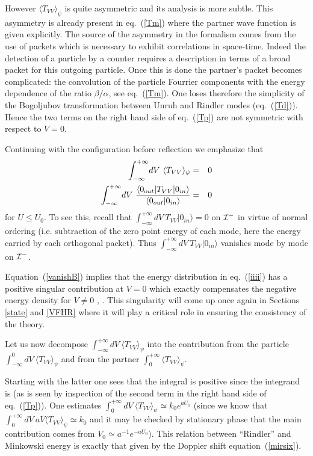 \documentclass[12pt,oneside]{report}
\def\ket#1{|#1\rangle}
\def\bra#1{\langle #1|}
\begin{document}
However $\langle T_{VV}\rangle_\psi$ is quite asymmetric and its
analysis is more subtle. This asymmetry is already present in 
eq.~(\ref{Tm}) where the partner wave function is given explicitly.
 The source of
the asymmetry in the formalism comes from the use of packets
which is necessary to exhibit correlations in space-time. Indeed the
detection of a particle by a counter requires a description in terms of
a broad packet for this outgoing particle. Once this is done the
partner's packet becomes complicated: the convolution of the particle
Fourrier components with the energy dependence of the ratio
$\beta / \alpha$, see eq.~(\ref{Tm}). One loses therefore the
simplicity of the Bogoljubov transformation between Unruh and
Rindler modes (eq.~(\ref{Td})). Hence  the  two terms on the right hand
side of eq.~(\ref{Tp}) are not symmetric with respect to $V=0$.

Continuing with the configuration before reflection
we emphasize that 
\begin{eqnarray}
\int_{-\infty}^{+\infty}
\!dV\ \langle T_{VV} \rangle_{\psi} &=&0\label{vanish}\\
\int_{-\infty}^{+\infty} \!dV\ { \bra{0_{out}} T_{VV}\ket{0_{in}}
\over
\bra{0_{out}} 0_{in}\rangle } &=& 0 \label{vanishB}
\end{eqnarray}
  for $U\leq U_0$. To see this, recall that 
$\int_{-\infty}^{+\infty}
\!dV\  T_{VV} \ket{0_{in}}=0$ on $\cal{I}^-$ in virtue of normal ordering (i.e. 
subtraction of the zero point energy of each mode, here the energy carried by
each orthogonal packet). Thus $\int_{-\infty}^{+\infty}\!dV\  T_{VV} \ket{0_{in}}$
vanishes mode by mode on $\cal{I}^-$.
 
Equation~(\ref{vanishB}) implies that the energy distribution in 
eq.~(\ref{iiii}) has a positive singular contribution at $V=0$ which exactly
compensates the negative energy density for $V\neq 0$
\cite{Pare}, \cite{MaPa}. This singularity will come up once again in Sections
\ref{state} and \ref{VFHR} where it will play a critical role in ensuring the
consistency of the theory.

Let us now decompose $\int_{-\infty}^{+\infty} \!dV\ \langle
T_{VV} \rangle_{\psi}$ into the contribution from the particle $\int_{-\infty}^0
\!dV\  \langle T_{VV} \rangle_{
\psi}$ and from the partner  $\int_0^{+\infty}
\langle T_{VV} \rangle_{\psi}$. 

Starting with the latter one
sees that the integral is positive since the integrand is
(as is seen by inspection of the second term in the right hand side of
eq.~(\ref{Tp})). One estimates  $\int_{0}^{+\infty}\!dV\ 
\langle T_{VV} \rangle_{\psi}
 \simeq k_0 e^{a U_0}$ (since we know that
$\int_0^{+\infty} \!dV\ a V \langle T_{VV} \rangle_{\psi}\simeq k_0$
and it may be checked by stationary phase that the main contribution comes from $V_0\simeq
a^{-1} e^{-a U_0}$). This relation between ``Rindler'' and Minkowski
energy is exactly that given by the Doppler shift equation~(\ref{mirsix}). 
\end{document}
